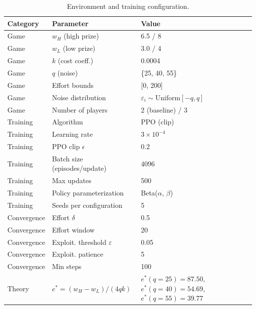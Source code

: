 \begin{table}[htbp]
\centering
\caption{Environment and training configuration.}
\label{tab:environment_config}
\begin{tabular}{lll}
\toprule
Category & Parameter & Value \\
\midrule
Game & $w_H$ (high prize) & 6.5 / 8 \\
Game & $w_L$ (low prize) & 3.0 / 4 \\
Game & $k$ (cost coeff.) & 0.0004 \\
Game & $q$ (noise) & \{25, 40, 55\} \\
Game & Effort bounds & [0, 200] \\
Game & Noise distribution & $\varepsilon_i \sim \text{Uniform}[-q, q]$ \\
Game & Number of players & 2 (baseline) / 3 \\
Training & Algorithm & PPO (clip) \\
Training & Learning rate & $3 \times 10^{-4}$ \\
Training & PPO clip $\epsilon$ & 0.2 \\
Training & Batch size (episodes/update) & 4096 \\
Training & Max updates & 500 \\
Training & Policy parameterization & Beta($\alpha$, $\beta$) \\
Training & Seeds per configuration & 5 \\
Convergence & Effort $\delta$ & 0.5 \\
Convergence & Effort window & 20 \\
Convergence & Exploit. threshold $\varepsilon$ & 0.05 \\
Convergence & Exploit. patience & 5 \\
Convergence & Min steps & 100 \\
Theory & $e^* = (w_H - w_L) / (4qk)$ & $e^*(q=25)=87.50$, $e^*(q=40)=54.69$, $e^*(q=55)=39.77$ \\
\bottomrule
\end{tabular}

\end{table}
